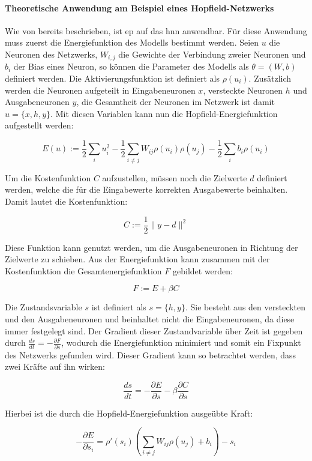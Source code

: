 \paragraph{Theoretische Anwendung am Beispiel eines Hopfield-Netzwerks}
\label{chap:Theoretische Anwendung am Beispiel eines Hopfield-Netzwerks}

Wie von \cite{Scellier2017} bereits beschrieben, ist \ac{ep} auf das \ac{hnn} anwendbar. Für diese Anwendung muss zuerst die Energiefunktion des Modells bestimmt werden. Seien \(u\) die Neuronen des Netzwerks, \(W_{i,j}\) die Gewichte der Verbindung zweier Neuronen und \(b_i\) der Bias eines Neuron, so können die Parameter des Modells als \(\theta=(W,b)\) definiert werden. Die Aktivierungsfunktion ist definiert als \(\rho(u_i)\). Zusätzlich werden die Neuronen aufgeteilt in Eingabeneuronen \(x\), versteckte Neuronen \(h\) und Ausgabeneuronen \(y\), die Gesamtheit der Neuronen im Netzwerk ist damit \(u=\{x,h,y\}\). Mit diesen Variablen kann nun die Hopfield-Energiefunktion aufgestellt werden:

\[E(u):=\frac{1}{2}\sum_iu_i^2-\frac{1}{2}\sum_{i\neq{j}}W_{ij}\rho(u_i)\rho(u_j)-\frac{1}{2}\sum_ib_i\rho(u_i)\]

Um die Kostenfunktion \(C\) aufzustellen, müssen noch die Zielwerte \(d\) definiert werden, welche die für die Eingabewerte korrekten Ausgabewerte beinhalten. Damit lautet die Kostenfunktion:

\[C:=\frac{1}{2}\|y-d\|^2\]

Diese Funktion kann genutzt werden, um die Ausgabeneuronen in Richtung der Zielwerte zu schieben. Aus der Energiefunktion kann zusammen mit der Kostenfunktion die Gesamtenergiefunktion \(F\) gebildet werden:

\[F:=E+\beta C\]

Die Zustandsvariable \(s\) ist definiert als \(s=\{h,y\}\). Sie besteht aus den versteckten und den Ausgabeneuronen und beinhaltet nicht die Eingabeneuronen, da diese immer festgelegt sind. Der Gradient dieser Zustandvariable über Zeit ist gegeben durch \(\frac{ds}{dt}=-\frac{\partial F}{\partial s}\), wodurch die Energiefunktion minimiert und somit ein Fixpunkt des Netzwerks gefunden wird. Dieser Gradient kann so betrachtet werden, dass zwei Kräfte auf ihn wirken:

\[\frac{ds}{dt}=-\frac{\partial E}{\partial s}-\beta\frac{\partial C}{\partial s}\]

Hierbei ist die durch die Hopfield-Energiefunktion ausgeübte Kraft:

\[-\frac{\partial E}{\partial s_i}=\rho'(s_i)\left(\sum_{i\neq{j}}W_{ij}\rho(u_j)+b_i\right)-s_i\]

